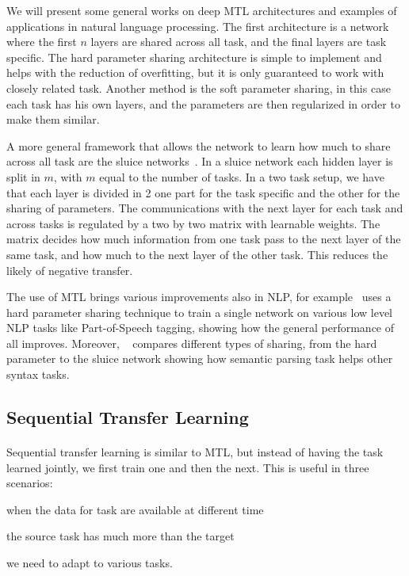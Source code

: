 We will present some general works on deep MTL architectures and examples of applications in natural language processing. The first architecture is a network where the first $n$ layers are shared across all task, and the final layers are task specific. The hard parameter sharing architecture is simple to implement and helps with the reduction of overfitting, but it is only guaranteed to work with closely related task. Another method is the soft parameter sharing, in this case each task has his own layers, and the parameters are then regularized in order to make them similar. 

A more general framework that allows the network to learn how much to share across all task are the sluice networks~\citep{ruder2017sluice}. In a sluice network each hidden layer is split in $m$, with $m$ equal to the number of tasks. In a two task setup, we have that each layer is divided in 2 one part for the task specific and the other for the sharing of parameters. The communications with the next layer for each task and across tasks is regulated by a two by two matrix with learnable weights. The matrix decides how much information from one task pass to the next layer of the same task, and how much to the next layer of the other task. This reduces the likely of negative transfer.

The use of MTL brings various improvements also in NLP, for example~\cite{collobert2008} uses a hard parameter sharing technique to train a single network on various low level NLP tasks like Part-of-Speech tagging, showing how the general performance of all improves. Moreover, ~\cite{abdou2018semanticmtl} compares different types of sharing, from the hard parameter to the sluice network showing how semantic parsing task helps other syntax tasks.


\subsection{Sequential Transfer Learning}
\paragraph{}
Sequential transfer learning is similar to MTL, but instead of having the task learned jointly, we first train one and then the next. This is useful in three scenarios: \begin{enumerate*}[a)]
  \item when the data for task are available at different time
  \item the source task has much more than the target
  \item we need to adapt to various tasks.
\end{enumerate*}


